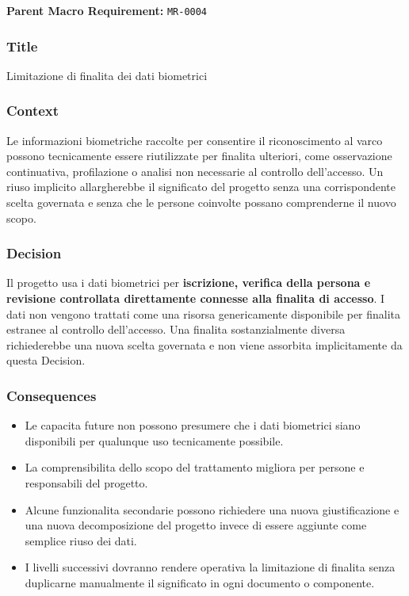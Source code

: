 \documentclass[
  10pt,
]{article}
\providecommand{\tightlist}{%
  \setlength{\itemsep}{0pt}\setlength{\parskip}{0pt}}
\begin{document}
\textbf{Parent Macro Requirement:} \texttt{MR-0004}

\subsubsection{Title}\label{title-6}

Limitazione di finalita dei dati biometrici

\subsubsection{Context}\label{context-6}

Le informazioni biometriche raccolte per consentire il riconoscimento al
varco possono tecnicamente essere riutilizzate per finalita ulteriori,
come osservazione continuativa, profilazione o analisi non necessarie al
controllo dell'accesso. Un riuso implicito allargherebbe il significato
del progetto senza una corrispondente scelta governata e senza che le
persone coinvolte possano comprenderne il nuovo scopo.

\subsubsection{Decision}\label{decision-6}

Il progetto usa i dati biometrici per \textbf{iscrizione, verifica della
persona e revisione controllata direttamente connesse alla finalita di
accesso}. I dati non vengono trattati come una risorsa genericamente
disponibile per finalita estranee al controllo dell'accesso. Una
finalita sostanzialmente diversa richiederebbe una nuova scelta
governata e non viene assorbita implicitamente da questa Decision.

\subsubsection{Consequences}\label{consequences-6}

\begin{itemize}
\tightlist
\item
  Le capacita future non possono presumere che i dati biometrici siano
  disponibili per qualunque uso tecnicamente possibile.
\item
  La comprensibilita dello scopo del trattamento migliora per persone e
  responsabili del progetto.
\item
  Alcune funzionalita secondarie possono richiedere una nuova
  giustificazione e una nuova decomposizione del progetto invece di
  essere aggiunte come semplice riuso dei dati.
\item
  I livelli successivi dovranno rendere operativa la limitazione di
  finalita senza duplicarne manualmente il significato in ogni documento
  o componente.
\end{itemize}
\end{document}
